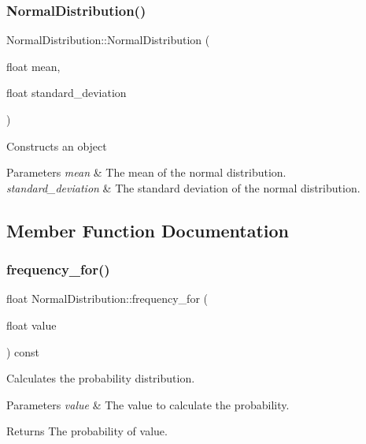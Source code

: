 \subsubsection{\texorpdfstring{Normal\+Distribution()}{NormalDistribution()}}
{\footnotesize\ttfamily Normal\+Distribution\+::\+Normal\+Distribution (\begin{DoxyParamCaption}\item[{float}]{mean,  }\item[{float}]{standard\+\_\+deviation }\end{DoxyParamCaption})\hspace{0.3cm}{\ttfamily [inline]}}

Constructs an object 
\begin{DoxyParams}{Parameters}
{\em mean} & The mean of the normal distribution. \\
\hline
{\em standard\+\_\+deviation} & The standard deviation of the normal distribution. \\
\hline
\end{DoxyParams}


\subsection{Member Function Documentation}
\mbox{\label{classNormalDistribution_a9e53ead03edb6441713d84eaa73976dd}} 
\subsubsection{\texorpdfstring{frequency\+\_\+for()}{frequency\_for()}}
{\footnotesize\ttfamily float Normal\+Distribution\+::frequency\+\_\+for (\begin{DoxyParamCaption}\item[{float}]{value }\end{DoxyParamCaption}) const\hspace{0.3cm}{\ttfamily [virtual]}}

Calculates the probability distribution. 
\begin{DoxyParams}{Parameters}
{\em value} & The value to calculate the probability. \\
\hline
\end{DoxyParams}
\begin{DoxyReturn}{Returns}
The probability of value. 
\end{DoxyReturn}


